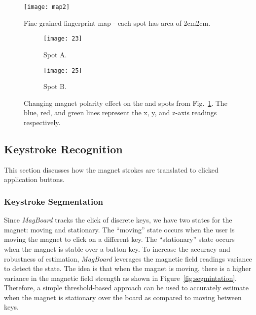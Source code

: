 \documentclass[conference]{IEEEtran}
\def \sys {\textit{MagBoard}}
\begin{document}
\begin{figure}[!t]
\centering
\texttt{[image: map2]}
\caption{Fine-grained fingerprint map - each spot has area of 2cm2cm. 
}
\label{fig:fingerprint_map}
\vspace{-0.2in}
\end{figure}
\begin{figure}[!t]
\centering
        \begin{subfigure}[t]{0.19\textwidth}
                \centering
                \texttt{[image: 23]}
                \caption{Spot A.}
                \label{fig:spot23}
        \end{subfigure}
        \begin{subfigure}[t]{0.19\textwidth}
                \centering
                \texttt{[image: 25]}
                \caption{Spot B.}
                \label{fig:spot25}
        \end{subfigure}
\caption{Changing magnet polarity effect on the  and  spots from Fig.~\ref{fig:fingerprint_map}. The blue, red, and green lines represent the x, y, and z-axis readings respectively.}
\label{fig:changing_polarity_effect}
\vspace{-0.2in}
\end{figure}

\subsection{Keystroke Recognition}

This section discusses how the magnet strokes are translated to clicked application buttons.

\subsubsection{Keystroke Segmentation} 
\label{sec:motion_det}

Since \sys{} tracks the click of discrete keys, we have two states for the magnet: moving and stationary. The ``moving'' state occurs when the user is moving the magnet to click on a different key. The ``stationary'' state occurs when the magnet is stable over a button key. To increase the accuracy and robustness of estimation, \sys{} leverages the magnetic field readings variance to detect the state. The idea is that when the magnet is moving, there is a higher variance in the magnetic field strength as shown in Figure~\ref{fig:segmintation}. Therefore, a simple threshold-based approach can be used to accurately estimate when the magnet is stationary over the board as compared to moving between keys. 
\end{document}
